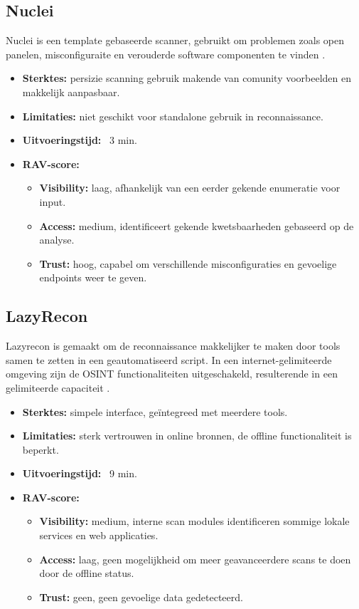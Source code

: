 \subsection{Nuclei}
Nuclei is een template gebaseerde scanner, gebruikt om problemen zoals open panelen, misconfiguraite en verouderde software componenten te vinden \autocite{Nuclei}.

\begin{itemize}
  \item \textbf{Sterktes:} persizie scanning gebruik makende van comunity voorbeelden en makkelijk aanpasbaar.
  \item \textbf{Limitaties:} niet geschikt voor standalone gebruik in reconnaissance.
  \item \textbf{Uitvoeringstijd:} ~3 min.
  \item \textbf{RAV-score:}
    \small{
    \begin{itemize}
      \item \textbf{Visibility:} laag, afhankelijk van een eerder gekende enumeratie voor input. 
      \item \textbf{Access:} medium, identificeert gekende kwetsbaarheden gebaseerd op de analyse.
      \item \textbf{Trust:} hoog, capabel om verschillende misconfiguraties en gevoelige endpoints weer te geven.
    \end{itemize}
    }
\end{itemize}

\subsection{LazyRecon}
Lazyrecon is gemaakt om de reconnaissance makkelijker te maken door tools samen te zetten in een geautomatiseerd script. 
In een internet-gelimiteerde omgeving zijn de OSINT functionaliteiten uitgeschakeld, resulterende in een gelimiteerde capaciteit \autocite{lazyrecon}.

\begin{itemize}
  \item \textbf{Sterktes:} simpele interface, geïntegreed met meerdere tools.
  \item \textbf{Limitaties:} sterk vertrouwen in online bronnen, de offline functionaliteit is beperkt. 
  \item \textbf{Uitvoeringstijd:} ~9 min.
  \item \textbf{RAV-score:}
    \small{
    \begin{itemize}
      \item \textbf{Visibility:} medium, interne scan modules identificeren sommige lokale services en web applicaties.
      \item \textbf{Access:} laag, geen mogelijkheid om meer geavanceerdere scans te doen door de offline status.
      \item \textbf{Trust:} geen, geen gevoelige data gedetecteerd. 
    \end{itemize}
    }
\end{itemize}

